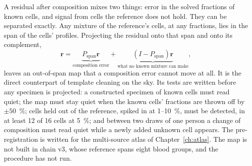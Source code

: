 A residual after composition mixes two things: error in the solved fractions of known cells, and signal from cells the reference does not hold. They can be
separated exactly. Any mixture of the reference's cells, at any fractions, lies in the span of the cells' profiles. Projecting the residual onto that span and
onto its complement,
\begin{equation}
  \mathbf r=\underbrace{P_{\mathrm{span}}\mathbf r}_{\text{composition error}}+\underbrace{(I-P_{\mathrm{span}})\mathbf r}_{\text{what no known mixture can make}},
  \label{eq:outspan}
\end{equation}
leaves an out-of-span map that a composition error cannot move at all. \derived{} It is the direct counterpart of template cleaning on the sky. Its tests are
written before any specimen is projected: a constructed specimen of known cells must read quiet; the map must
stay quiet when the known cells' fractions are thrown off by $\pm50$~\%; cells held out of the reference, spiked in at 1--10~\%, must be detected, in at least 12 of 16 cells at 5~\%; and between two
draws of one person a change of composition must read quiet while a newly added unknown cell appears. \prediction{} The pre-registration is written for the multi-source atlas of
Chapter~\ref{ch:atlas}. The map is not built in chain v3, whose reference spans eight blood groups, and the procedure has not run. \openprob
